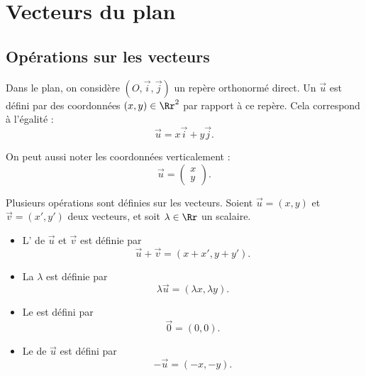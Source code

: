 \documentclass[11pt,class=report,crop=false]{standalone}
\begin{document}
\newcommand{\myparallel}{/\!\!/}








\section{Vecteurs du plan}


\subsection{Opérations sur les vecteurs}

Dans le plan, on considère $(O, \vec i, \vec j)$ un repère orthonormé direct.
Un  $\vec u$ est défini par des coordonnées $(x, y) \in \Rr^2$ par rapport à ce repère.
Cela correspond à l'égalité :
$$
    \vec u = x \vec i + y \vec j.
$$


On peut aussi noter les coordonnées verticalement :
$$
    \vec u = \begin{pmatrix} x \\ y \end{pmatrix}.
$$


Plusieurs opérations sont définies sur les vecteurs.
Soient $\vec u = (x,y)$ et $\vec v = (x',y')$ deux vecteurs, et soit $\lambda \in \Rr$ un scalaire.
\begin{itemize}
    \item L' de $\vec u$ et $\vec v$ est définie par
        \[ \vec u + \vec v = (x+x', y+y'). \]
    \item La  $\lambda$ est définie par
        \[ \lambda \vec u = (\lambda x, \lambda y). \]
    \item Le  est défini par
        \[ \vec 0 = (0,0). \]
    \item Le  de $\vec u$ est défini par
        \[ -\vec u = (-x,-y). \]
\end{itemize}
\end{document}

